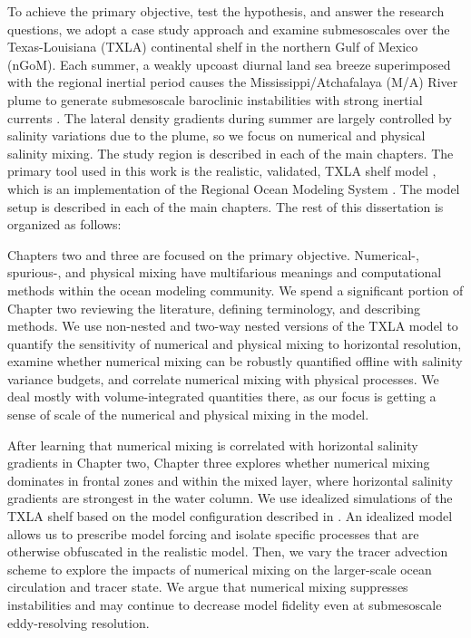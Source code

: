 To achieve the primary objective, test the hypothesis, and answer the research questions, we adopt a case study approach and examine submesoscales over the Texas-Louisiana (TXLA) continental shelf in the northern Gulf of Mexico (nGoM). Each summer, a weakly upcoast diurnal land sea breeze superimposed with the regional inertial period causes the Mississippi/Atchafalaya (M/A) River plume to generate submesoscale baroclinic instabilities with strong inertial currents \citep{Hetland_2017, Kobashi_2020, qu2022rapid}. The lateral density gradients during summer are largely controlled by salinity variations due to the plume, so we focus on numerical and physical salinity mixing. The study region is described in each of the main chapters. The primary tool used in this work is the realistic, validated, TXLA shelf model \citep{Kobashi_2020, Schlichting23, Zhang_2012_forecast}, which is an implementation of the Regional Ocean Modeling System \citep[ROMS][]{shchepetkin2005regional}. The model setup is described in each of the main chapters. The rest of this dissertation is organized as follows: 

Chapters two and three are focused on the primary objective. Numerical-, spurious-, and physical mixing have multifarious meanings and computational methods within the ocean modeling community. We spend a significant portion of Chapter two reviewing the literature, defining terminology, and describing methods. We use non-nested and two-way nested versions of the TXLA model to quantify the sensitivity of numerical and physical mixing to horizontal resolution, examine whether numerical mixing can be robustly quantified offline with salinity variance budgets, and correlate numerical mixing with physical processes. We deal mostly with volume-integrated quantities there, as our focus is getting a sense of scale of the numerical and physical mixing in the model. 

After learning that numerical mixing is correlated with horizontal salinity gradients in Chapter two, Chapter three explores whether numerical mixing dominates in frontal zones and within the mixed layer, where horizontal salinity gradients are strongest in the water column. We use idealized simulations of the TXLA shelf based on the model configuration described in \cite{Hetland_2017}. An idealized model allows us to prescribe model forcing and isolate specific processes that are otherwise obfuscated in the realistic model. Then, we vary the tracer advection scheme to explore the impacts of numerical mixing on the larger-scale ocean circulation and tracer state. We argue that numerical mixing suppresses instabilities and may continue to decrease model fidelity even at submesoscale eddy-resolving resolution. 

